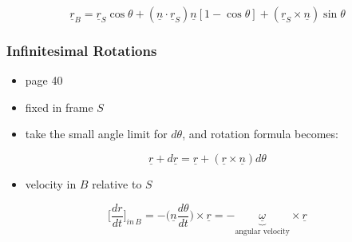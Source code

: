 \documentclass[a4paper,11pt,normalem]{article}
\begin{document}
\[
    \underline{r}_B = \underline{r}_S \cos\theta + (\underline{n} \cdot \underline{r}_S)\underline{n}[1 - \cos\theta] + (\underline{r}_S \times \underline{n})\sin\theta
\]

\subsubsection{Infinitesimal Rotations}\label{infinitesimal-rotations}

\begin{itemize}
\item
  page 40
\item
  fixed in frame \(S\)
\item
  take the small angle limit for \(d\theta\), and rotation formula
  becomes:
\end{itemize}

\[
    \underline{r} + d\underline{r} = \underline{r} + (\underline{r} \times \underline{n})d\theta
\]

\begin{itemize}
\item
  velocity in \(B\) relative to \(S\)
\end{itemize}

\[
    \Big[\frac{dr}{dt}\Big]_{in\,B_{}} = -\Big(\underline{n}\frac{d\theta}{dt}\Big) \times \underline{r} = -\underbrace{\underline{\omega}}_{\text{angular velocity}} \times \underline{r}
\]
\end{document}
